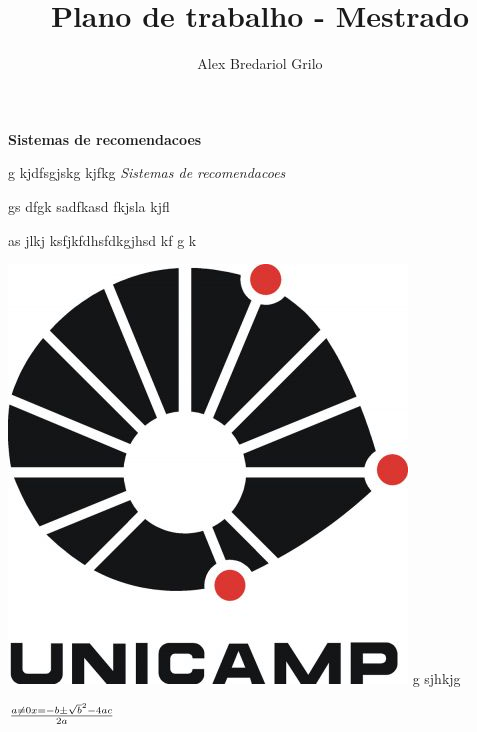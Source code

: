 \documentclass{article}
\title{Plano de trabalho - Mestrado}
\author{Alex Bredariol Grilo}
\begin{document}
\maketitle
\textbf{Sistemas de recomendacoes}

g kjdfsgjskg kjfkg
\textit{Sistemas de recomendacoes}

gs dfgk
sadfkasd fkjsla kjfl


as jlkj ksfjkfdhsfdkgjhsd kf g k


 \includegraphics{teste.jpg}
g sjhkjg

$a \ne 0 x =  -b \pm \sqrt  b^2-4ac  \over 2a  $
\end{document}

